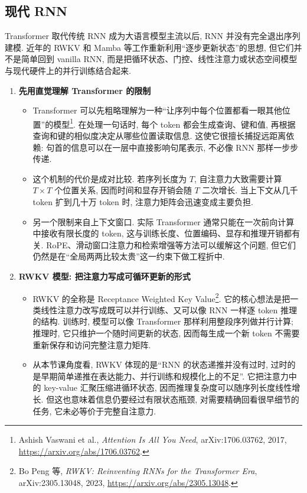 \documentclass{../nndlcourse}
\begin{document}
\subsection{现代 RNN}

Transformer 取代传统 RNN 成为大语言模型主流以后, RNN 并没有完全退出序列建模. 近年的 RWKV 和 Mamba 等工作重新利用“逐步更新状态”的思想, 但它们并不是简单回到 vanilla RNN, 而是把循环状态、门控、线性注意力或状态空间模型与现代硬件上的并行训练结合起来.

\begin{enumerate}
\item \textbf{先用直觉理解 Transformer 的限制}
  \begin{itemize}
    \item Transformer 可以先粗略理解为一种“让序列中每个位置都看一眼其他位置”的模型\footnote{Ashish Vaswani et al., \textit{Attention Is All You Need}, arXiv:1706.03762, 2017, \url{https://arxiv.org/abs/1706.03762}.}. 在处理一句话时, 每个 token 都会生成查询、键和值, 再根据查询和键的相似度决定从哪些位置读取信息. 这使它很擅长捕捉远距离依赖: 句首的信息可以在一层中直接影响句尾表示, 不必像 RNN 那样一步步传递.
    \item 这个机制的代价是成对比较. 若序列长度为 $T$, 自注意力大致需要计算 $T\times T$ 个位置关系, 因而时间和显存开销会随 $T$ 二次增长. 当上下文从几千 token 扩到几十万 token 时, 注意力矩阵会迅速变成主要负担.
    \item 另一个限制来自上下文窗口. 实际 Transformer 通常只能在一次前向计算中接收有限长度的 token, 这与训练长度、位置编码、显存和推理开销都有关. RoPE、滑动窗口注意力和检索增强等方法可以缓解这个问题, 但它们仍然是在“全局两两比较太贵”这一约束下做工程折中.
  \end{itemize}

\item \textbf{RWKV 模型: 把注意力写成可循环更新的形式}
  \begin{itemize}
    \item RWKV 的全称是 Receptance Weighted Key Value\footnote{Bo Peng 等, \textit{RWKV\@: Reinventing RNNs for the Transformer Era}, arXiv:2305.13048, 2023, \url{https://arxiv.org/abs/2305.13048}.}. 它的核心想法是把一类线性注意力改写成既可以并行训练、又可以像 RNN 一样逐 token 推理的结构. 训练时, 模型可以像 Transformer 那样利用整段序列做并行计算; 推理时, 它只维护一个随时间更新的状态, 因而每生成一个新 token 不需要重新保存和访问完整注意力矩阵.
    \item 从本节课角度看, RWKV 体现的是“RNN 的状态递推并没有过时, 过时的是早期简单递推在表达能力、并行训练和规模化上的不足”. 它把注意力中的 key-value 汇聚压缩进循环状态, 因而推理复杂度可以随序列长度线性增长. 但这也意味着信息仍要经过有限状态瓶颈, 对需要精确回看很早细节的任务, 它未必等价于完整自注意力.
  \end{itemize}


\end{enumerate}
\end{document}
